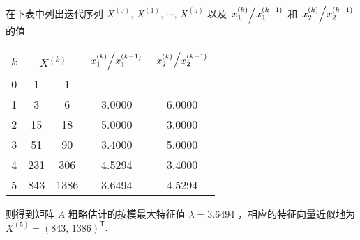\documentclass[11pt]{article}
\begin{document}
\begin{question}
{    在下表中列出迭代序列 $X^{(0)},\, X^{(1)},\, \cdots,\, X^{(5)}$ 以及 $\left.x_1^{(k)} \middle/ x_1^{(k - 1)}\right.$ 和 $\left.x_2^{(k)} \middle/ x_2^{(k - 1)}\right.$ 的值
    \begin{center}
        \begin{tabular}{|c|c|c|c|c|}
            \hline
            $k$ & \multicolumn{2}{|c|}{$X^{(k)}$} & $\left.x_1^{(k)} \middle/ x_1^{(k - 1)}\right.$ & $\left.x_2^{(k)} \middle/ x_2^{(k - 1)}\right.$          \\ \hline
            0   & 1                               & 1                                               &                                                 &        \\ \hline
            1   & 3                               & 6                                               & 3.0000                                          & 6.0000 \\ \hline
            2   & 15                              & 18                                              & 5.0000                                          & 3.0000 \\ \hline
            3   & 51                              & 90                                              & 3.4000                                          & 5.0000 \\ \hline
            4   & 231                             & 306                                             & 4.5294                                          & 3.4000 \\ \hline
            5   & 843                             & 1386                                            & 3.6494                                          & 4.5294 \\ \hline
        \end{tabular}
    \end{center}
    则得到矩阵 $A$ 粗略估计的按模最大特征值 $\lambda = 3.6494$ ，相应的特征向量近似地为 $X^{(5)} = (843,\, 1386)^\mathsf{T}$.
    }
\end{question}
\end{document}
